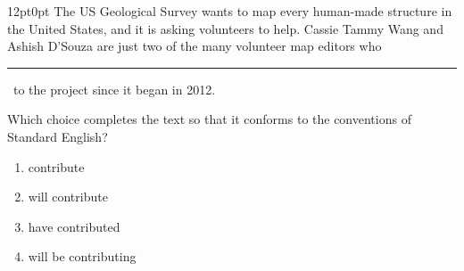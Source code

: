 \documentclass[11pt, twocolumn]{article}
\newcounter{questionnum}
\begin{document}
\vspace{6pt}\noindent
\begin{minipage}{\columnwidth}\raggedright
\noindent{}\par\vspace{8pt}
\begin{adjustwidth}{12pt}{0pt}
The US Geological Survey wants to map every human-made structure in the United States, and it is asking volunteers to help. Cassie Tammy Wang and Ashish D'Souza are just two of the many volunteer map editors who \,\rule{2cm}{0.4pt}\, to the project since it began in 2012.
\vspace{6pt}

Which choice completes the text so that it conforms to the conventions of Standard English?
\begin{enumerate}[label=\Alph*),leftmargin=18pt,topsep=3pt,itemsep=2pt]
  \item contribute
  \item will contribute
  \item have contributed
  \item will be contributing
\end{enumerate}
\end{adjustwidth}
\end{minipage}\par
\end{document}
